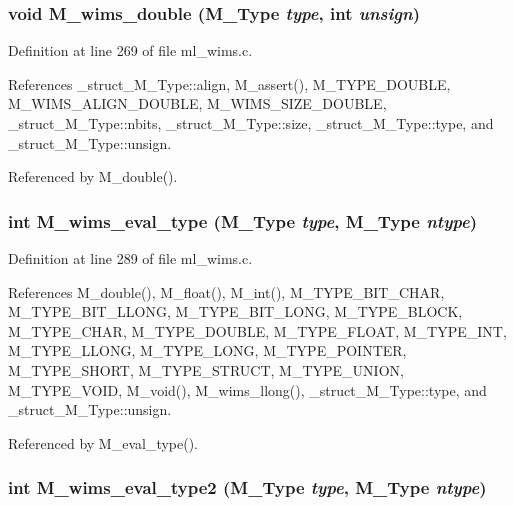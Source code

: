 \subsubsection{\setlength{\rightskip}{0pt plus 5cm}void M\_\-wims\_\-double (\bf{M\_\-Type} {\em type}, int {\em unsign})}\label{m__wims_8h_6be6ed3ff4ec5e30ae7b8c099b691fc4}




Definition at line 269 of file ml\_\-wims.c.

References \_\-struct\_\-M\_\-Type::align, M\_\-assert(), M\_\-TYPE\_\-DOUBLE, M\_\-WIMS\_\-ALIGN\_\-DOUBLE, M\_\-WIMS\_\-SIZE\_\-DOUBLE, \_\-struct\_\-M\_\-Type::nbits, \_\-struct\_\-M\_\-Type::size, \_\-struct\_\-M\_\-Type::type, and \_\-struct\_\-M\_\-Type::unsign.

Referenced by M\_\-double().
\subsubsection{\setlength{\rightskip}{0pt plus 5cm}int M\_\-wims\_\-eval\_\-type (\bf{M\_\-Type} {\em type}, \bf{M\_\-Type} {\em ntype})}\label{m__wims_8h_e2eb5f2b02c0e0b3d097a56ab71f6a06}




Definition at line 289 of file ml\_\-wims.c.

References M\_\-double(), M\_\-float(), M\_\-int(), M\_\-TYPE\_\-BIT\_\-CHAR, M\_\-TYPE\_\-BIT\_\-LLONG, M\_\-TYPE\_\-BIT\_\-LONG, M\_\-TYPE\_\-BLOCK, M\_\-TYPE\_\-CHAR, M\_\-TYPE\_\-DOUBLE, M\_\-TYPE\_\-FLOAT, M\_\-TYPE\_\-INT, M\_\-TYPE\_\-LLONG, M\_\-TYPE\_\-LONG, M\_\-TYPE\_\-POINTER, M\_\-TYPE\_\-SHORT, M\_\-TYPE\_\-STRUCT, M\_\-TYPE\_\-UNION, M\_\-TYPE\_\-VOID, M\_\-void(), M\_\-wims\_\-llong(), \_\-struct\_\-M\_\-Type::type, and \_\-struct\_\-M\_\-Type::unsign.

Referenced by M\_\-eval\_\-type().
\subsubsection{\setlength{\rightskip}{0pt plus 5cm}int M\_\-wims\_\-eval\_\-type2 (\bf{M\_\-Type} {\em type}, \bf{M\_\-Type} {\em ntype})}\label{m__wims_8h_7542b1f9b6ac532563ad8708df6f87cd}




